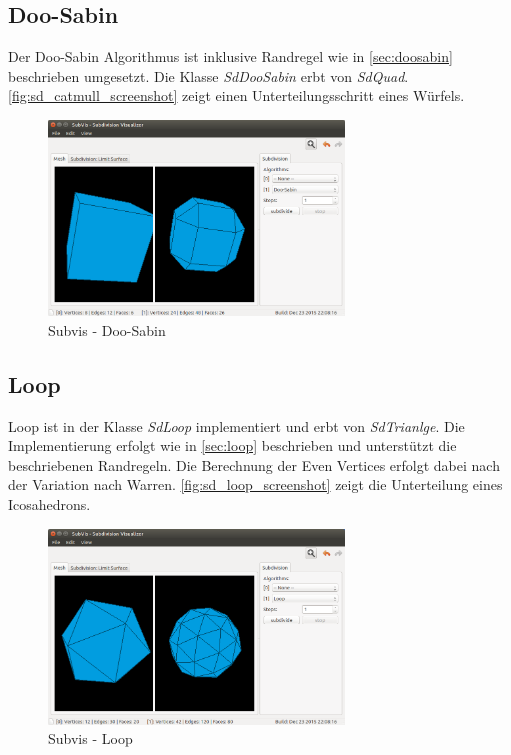 \subsection{Doo-Sabin}

Der Doo-Sabin Algorithmus ist inklusive Randregel wie in \autoref{sec:doosabin}
beschrieben umgesetzt. Die Klasse \emph{SdDooSabin} erbt von \emph{SdQuad}.
\autoref{fig:sd_catmull_screenshot} zeigt einen Unterteilungsschritt eines Würfels.

\begin{figure}
  \centering
  \includegraphics[width=0.7\textwidth]{content/media/sd_doosabin_screenshot.png}
  \caption{Subvis - Doo-Sabin}
  \label{fig:sd_doosabin_screenshot}
\end{figure}

\subsection{Loop}

Loop ist in der Klasse \emph{SdLoop} implementiert und erbt von \emph{SdTrianlge}.
Die Implementierung erfolgt wie in \autoref{sec:loop} beschrieben
und unterstützt die beschriebenen Randregeln.
Die Berechnung der Even Vertices erfolgt dabei nach der Variation nach Warren.
\autoref{fig:sd_loop_screenshot} zeigt die Unterteilung eines Icosahedrons.

\begin{figure}
  \centering
  \includegraphics[width=0.7\textwidth]{content/media/sd_loop_screenshot.png}
  \caption{Subvis - Loop}
  \label{fig:sd_loop_screenshot}
\end{figure}

